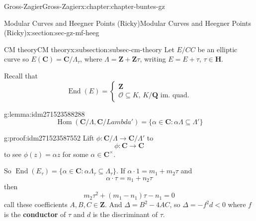 \documentclass[oneside,10pt,]{book}
\newcommand{\terminology}[1]{\textbf{#1}}
\numberwithin{equation}{section}
\newcommand{\ZZ}{\mathbf{Z}}
\newcommand{\QQ}{\mathbf{Q}}
\newcommand{\CC}{\mathbf{C}}
\newcommand{\HH}{\mathbf{H}}
\newcommand{\ints}{\mathcal{O}}
\DeclareMathOperator{\End}{End}
\DeclareMathOperator{\Hom}{Hom}
\newcommand{\lt}{<}
\begin{document}
\begin{chapterptx}{Gross-Zagier}{}{Gross-Zagier}{}{}{x:chapter:chapter-buntes-gz}
%
%
\typeout{************************************************}
\typeout{************************************************}
%
\begin{sectionptx}{Modular Curves and Heegner Points (Ricky)}{}{Modular Curves and Heegner Points (Ricky)}{}{}{x:section:sec-gz-mf-heeg}
%
%
\typeout{************************************************}
\typeout{************************************************}
%
\begin{subsectionptx}{CM theory}{}{CM theory}{}{}{x:subsection:subsec-cm-theory}
Let \(E/CC\) be an elliptic curve so \(E(\CC) = \CC/\Lambda_\tau  \), where \(\Lambda  = \ZZ + \ZZ\tau \), writing \(E = E+\tau \), \(\tau  \in \HH\).%
\par
Recall that%
\begin{equation*}
\End(E) = \begin{cases} \ZZ \\ \ints \subseteq K ,\,K/\QQ \text{ im. quad.}\end{cases}
\end{equation*}
%
\begin{lemma}{}{}{g:lemma:idm271523588288}%
%
\begin{equation*}
\Hom(\CC/\Lambda ,\CC/Lambda')= \{\alpha \in \CC : \alpha  \Lambda  \subseteq \Lambda '\}
\end{equation*}
%
\end{lemma}
\begin{proofptx}{}{g:proof:idm271523587552}
Lift \(\phi  \colon \CC/\Lambda  \to \CC/\Lambda '\) to%
\begin{equation*}
\phi  \colon \CC  \to \CC
\end{equation*}
to see \(\phi (z) = \alpha  z\) for some \(\alpha  \in \CC^\times\).%
\end{proofptx}
So \(\End(E_\tau ) = \{\alpha \in \CC : \alpha  \Lambda _\tau  \subseteq \Lambda _\tau \}\). If \(\alpha  \cdot 1 = m_1 + m_2 \tau \) and%
\begin{equation*}
\alpha \cdot \tau  = n_1 + n_2 \tau 
\end{equation*}
then%
\begin{equation*}
m_2 \tau ^2 + (m_1 - n_1) \tau  - n_1 = 0
\end{equation*}
call these coefficients \(A,B,C \in \ZZ\). And \(\Delta = B^2 - 4AC\), so \(\Delta  = -f^2 d \lt 0\) where \(f\) is the \terminology{conductor} of \(\tau \) and \(d\) is the discriminant of \(\tau \).%
\par

\end{subsectionptx}
\end{sectionptx}
\end{chapterptx}
\end{document}
